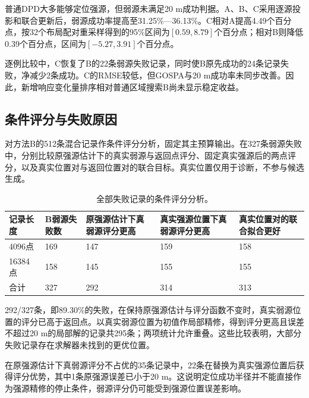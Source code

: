\documentclass[11pt,a4paper]{article}
\numberwithin{equation}{section}
\numberwithin{figure}{section}
\numberwithin{table}{section}
\begin{document}
普通DPD大多能够定位强源，但弱源未满足20 m成功判据。A、B、C采用逐源投影和联合更新后，弱源成功率提高至31.25\%—36.13\%。C相对A提高4.49个百分点，按32个布局配对重采样得到的95\%区间为$[0.59,8.79]$个百分点；相对B则降低0.39个百分点，区间为$[-5.27,3.91]$个百分点。

逐例比较中，C恢复了B的22条弱源失败记录，同时使B原先成功的24条记录失败，净减少2条成功。C的RMSE较低，但GOSPA与20 m成功率未同步改善。因此，新增响应变化量排序相对普通区域搜索B尚未显示稳定收益。


\subsection{条件评分与失败原因}\label{sec:3.5}

对方法B的512条混合记录作条件评分分析，固定其主预算输出。在327条弱源失败中，分别比较原强源估计下的真实弱源与返回点评分、固定真实强源后的两点评分，以及真实位置对与返回位置对的联合目标。真实位置仅用于诊断，不参与候选生成。

\begin{table}[!htbp]
\centering
\caption{全部失败记录的条件评分分析。}\label{tab:3.5}
\small
\setlength{\tabcolsep}{4pt}
\renewcommand{\arraystretch}{1.2}
\begin{tabularx}{\linewidth}{Y{0.65}Y{0.8}Y{1.15}Y{1.2}Y{1.2}}
\toprule
\textbf{记录长度} & \textbf{B弱源失败数} & \textbf{原强源估计下真弱源评分更高} & \textbf{真实强源位置下真弱源评分更高} & \textbf{真实位置对的联合拟合更好} \\
\midrule
4096点 & 169 & 147 & 159 & 158 \\
16384点 & 158 & 145 & 155 & 155 \\
合计 & 327 & 292 & 314 & 313 \\
\bottomrule
\end{tabularx}
\end{table}

292/327条，即89.30\%的失败，在保持原强源估计与评分函数不变时，真实弱源位置的评分已高于返回点。以真实弱源位置为初值作局部精修，得到评分更高且误差不超过20 m的局部解的记录共295条；两项统计允许重叠。这些比较表明，大部分失败记录存在求解器未找到的更优位置。

在原强源估计下真弱源评分不占优的35条记录中，22条在替换为真实强源位置后获得评分优势，其中1条原强源误差已小于20 m。这说明定位成功半径并不能直接作为强源精修的停止条件，弱源评分仍可能受到强源位置误差影响。
\end{document}
